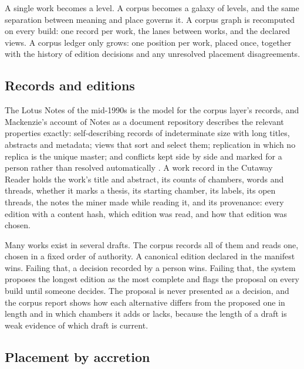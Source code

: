 \documentclass[11pt]{article}
\theoremstyle{remark}
\begin{document}
A single work becomes a level. A corpus becomes a galaxy of levels, and the same separation between meaning and place governs it. A corpus graph is recomputed on every build: one record per work, the lanes between works, and the declared views. A corpus ledger only grows: one position per work, placed once, together with the history of edition decisions and any unresolved placement disagreements.

\subsection{Records and editions}

The Lotus Notes of the mid-1990s is the model for the corpus layer's records, and Mackenzie's account of Notes as a document repository describes the relevant properties exactly: self-describing records of indeterminate size with long titles, abstracts and metadata; views that sort and select them; replication in which no replica is the unique master; and conflicts kept side by side and marked for a person rather than resolved automatically \cite{mackenzie1995}. A work record in the Cutaway Reader holds the work's title and abstract, its counts of chambers, words and threads, whether it marks a thesis, its starting chamber, its labels, its open threads, the notes the miner made while reading it, and its provenance: every edition with a content hash, which edition was read, and how that edition was chosen.

Many works exist in several drafts. The corpus records all of them and reads one, chosen in a fixed order of authority. A canonical edition declared in the manifest wins. Failing that, a decision recorded by a person wins. Failing that, the system proposes the longest edition as the most complete and flags the proposal on every build until someone decides. The proposal is never presented as a decision, and the corpus report shows how each alternative differs from the proposed one in length and in which chambers it adds or lacks, because the length of a draft is weak evidence of which draft is current.

\subsection{Placement by accretion}
\end{document}
